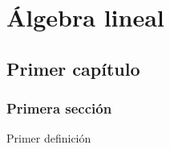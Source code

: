 %
%
%

\part{Álgebra lineal}

\chapter{Primer capítulo}

\section{Primera sección}

\begin{definition}
Primer definición
\end{definition}

